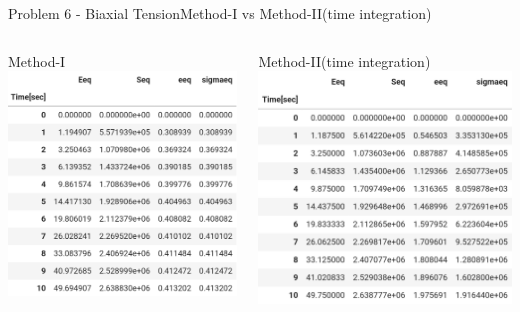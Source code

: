 \documentclass{beamer}
\begin{document}
\begin{frame}{Problem 6 - Biaxial Tension}{Method-I vs Method-II(time integration)}
    \vspace{-2em}
    \begin{columns}
        \begin{block}{\footnotesize Method-I}
            \includegraphics[width=\textwidth]{Values/m2t6.png}
        \end{block}
        \begin{block}{\footnotesize Method-II(time integration)}
            \includegraphics[width=\textwidth]{Values/m1t6.png}
        \end{block}
    \end{columns}
\end{frame}
\end{document}

